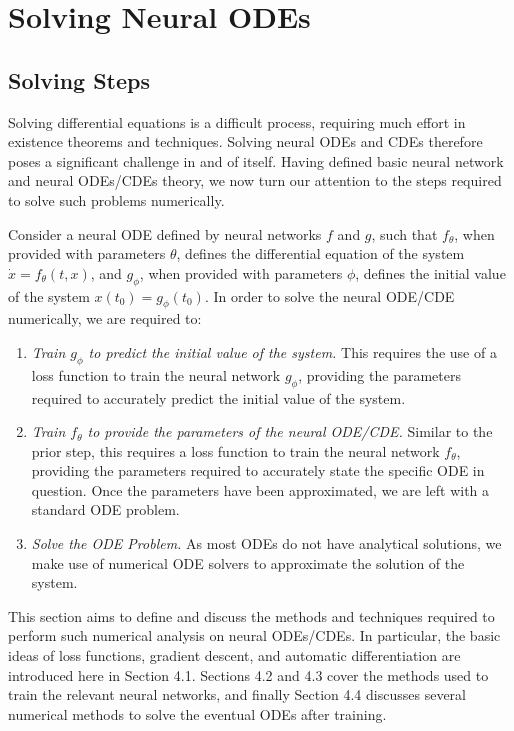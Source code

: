 \documentclass[a4paper,11pt, titlepage]{article}
\theoremstyle{definition}
\theoremstyle{plain}
\theoremstyle{remark}
\begin{document}
\section{Solving Neural ODEs}

\subsection{Solving Steps}

Solving differential equations is a difficult process, requiring much effort in existence theorems and techniques. Solving neural ODEs and CDEs therefore poses a significant challenge in and of itself. Having defined basic neural network and neural ODEs/CDEs theory, we now turn our attention to the steps required to solve such problems numerically.

Consider a neural ODE defined by neural networks $f$ and $g$, such that $f_\theta$, when provided with parameters $\theta$, defines the differential equation of the system $\dot{x} = f_\theta\left(t, x\right)$, and $g_\phi$, when provided with parameters $\phi$, defines the initial value of the system $x\left(t_0\right) = g_\phi(t_0)$. In order to solve the neural ODE/CDE numerically, we are required to:

\begin{enumerate}
    \item \textit{Train $g_\phi$ to predict the initial value of the system.} This requires the use of a loss function to train the neural network $g_\phi$, providing the parameters required to accurately predict the initial value of the system. 
    \item \textit{Train $f_\theta$ to provide the parameters of the neural ODE/CDE.} Similar to the prior step, this requires a loss function to train the neural network $f_\theta$, providing the parameters required to accurately state the specific ODE in question. Once the parameters have been approximated, we are left with a standard ODE problem.
    \item \textit{Solve the ODE Problem.} As most ODEs do not have analytical solutions, we make use of numerical ODE solvers to approximate the solution of the system.
\end{enumerate}

This section aims to define and discuss the methods and techniques required to perform such numerical analysis on neural ODEs/CDEs. In particular, the basic ideas of loss functions, gradient descent, and automatic differentiation are introduced here in Section 4.1. Sections 4.2 and 4.3 cover the methods used to train the relevant neural networks, and finally Section 4.4 discusses several numerical methods to solve the eventual ODEs after training.
\end{document}
